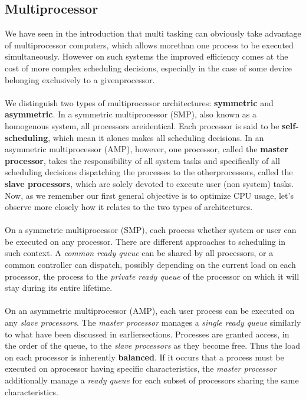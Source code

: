 \documentclass[11pt,a4paper]{scrreprt}
\begin{document}
\subsection{Multiprocessor}
We have seen in the introduction that multi tasking can obviously take advantage of multiprocessor computers, which allows morethan one process to be executed simultaneously. However on such systems the improved efficiency comes at the cost of more complex scheduling decisions, especially in the case of some device belonging exclusively to a givenprocessor. \\\\
We distinguish two types of multiprocessor architectures: \textbf{symmetric} and \textbf{asymmetric}. In a symmetric multiprocessor (SMP), also known as a homogenous system, all processors areidentical. Each processor is said to be \textbf{self-scheduling}, which mean it alones makes all scheduling decisions. In an asymmetric multiprocessor (AMP), however, one processor, called the \textbf{master processor}, takes the responsibility of all system tasks and specifically of all scheduling decisions dispatching the processes to the otherprocessors, called the \textbf{slave processors}, which are solely devoted to execute user (non system) tasks. Now, as we remember our first general objective is to optimize CPU usage, let’s observe more closely how it relates to the two types of architectures. \\\\
On a symmetric multiprocessor (SMP), each process whether system or user can be executed on any processor. There are different approaches to scheduling in such context. A \textit{common ready queue} can be shared by all processors, or a common controller can dispatch, possibly depending on the current load on each processor, the process to the \textit{private ready queue} of the processor on which it will stay during its entire lifetime. \\\\
On an asymmetric multiprocessor (AMP), each user process can be executed on any \textit{slave processors}. The \textit{master processor} manages a \textit{single ready queue} similarly to what have been discussed in earliersections. Processes are granted access, in the order of the queue, to the \textit{slave processors} as they become free. Thus the load on each processor is inherently \textbf{balanced}. If it occurs that a process must be executed on aprocessor having specific characteristics, the \textit{master processor} additionally manage a \textit{ready queue} for each subset of processors sharing the same characteristics. \\\\
\end{document}
